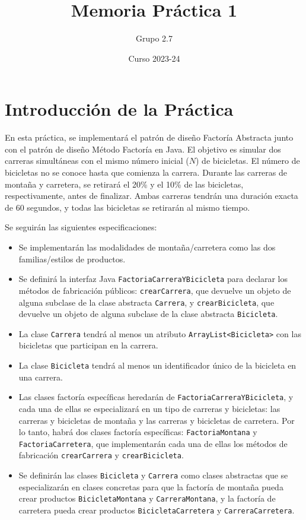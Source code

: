 \documentclass{article}
\title{Memoria Práctica 1}
\author{Grupo 2.7}
\date{Curso 2023-24}
\begin{document}
\maketitle

\section{Introducción de la Práctica}
En esta práctica, se implementará el patrón de diseño Factoría Abstracta junto con el patrón de diseño Método Factoría en Java. El objetivo es simular dos carreras simultáneas con el mismo número inicial ($N$) de bicicletas. El número de bicicletas no se conoce hasta que comienza la carrera. Durante las carreras de montaña y carretera, se retirará el 20\% y el 10\% de las bicicletas, respectivamente, antes de finalizar. Ambas carreras tendrán una duración exacta de 60 segundos, y todas las bicicletas se retirarán al mismo tiempo.

Se seguirán las siguientes especificaciones:

\begin{itemize}
    \item Se implementarán las modalidades de montaña/carretera como las dos familias/estilos de productos.
    \item Se definirá la interfaz Java \texttt{FactoriaCarreraYBicicleta} para declarar los métodos de fabricación públicos: \texttt{crearCarrera}, que devuelve un objeto de alguna subclase de la clase abstracta \texttt{Carrera}, y \texttt{crearBicicleta}, que devuelve un objeto de alguna subclase de la clase abstracta \texttt{Bicicleta}.
    \item La clase \texttt{Carrera} tendrá al menos un atributo \texttt{ArrayList<Bicicleta>} con las bicicletas que participan en la carrera.
    \item La clase \texttt{Bicicleta} tendrá al menos un identificador único de la bicicleta en una carrera.
    \item Las clases factoría específicas heredarán de \texttt{FactoriaCarreraYBicicleta}, y cada una de ellas se especializará en un tipo de carreras y bicicletas: las carreras y bicicletas de montaña y las carreras y bicicletas de carretera. Por lo tanto, habrá dos clases factoría específicas: \texttt{FactoriaMontana} y \texttt{FactoriaCarretera}, que implementarán cada una de ellas los métodos de fabricación \texttt{crearCarrera} y \texttt{crearBicicleta}.
    \item Se definirán las clases \texttt{Bicicleta} y \texttt{Carrera} como clases abstractas que se especializarán en clases concretas para que la factoría de montaña pueda crear productos \texttt{BicicletaMontana} y \texttt{CarreraMontana}, y la factoría de carretera pueda crear productos \texttt{BicicletaCarretera} y \texttt{CarreraCarretera}.
\end{itemize}
\end{document}
